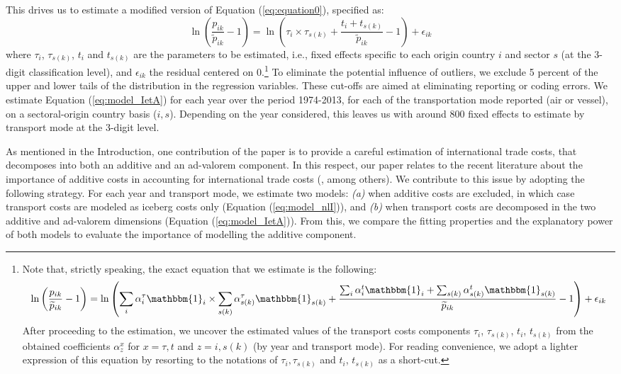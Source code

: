 \documentclass[a4paper,11pt]{article}
\begin{document}
This drives us to estimate a modified version of Equation (\ref{eq:equation0}), specified as:
\begin{equation}
\ln\left(\frac{p_{ik}}{\widetilde{p}_{ik}}-1 \right)= \ln \left(\tau_{i} \times \tau_{s(k)}+\frac{t_{i} + t_{s(k)}}{\widetilde{p}_{ik}}-1 \right) + \epsilon_{ik} \label{eq:model_IetA}
\end{equation}
where $\tau_{i}$, $\tau_{s(k)}$, $t_{i}$ and $t_{s(k)}$ are the parameters to be estimated, i.e., fixed effects specific to each origin country $i$ and sector $s$ (at the 3-digit classification level), and $\epsilon_{ik}$ the residual centered on 0.\footnote{Note that, strictly speaking, the exact equation that we estimate is the following:
$$\ln\left(\frac{p_{ik}}{\widetilde{p}_{ik}}-1 \right)= \ln \left(\sum_i \alpha_i^\tau \mathbbm{1}_i \times \sum_{s(k)}\alpha_{s(k)}^\tau \mathbbm{1}_{s(k)}+ \frac{\sum_i\alpha_i^t\mathbbm{1}_i + \sum_{s(k)}\alpha^t_{s(k)}\mathbbm{1}_{s(k)}}{\widetilde{p}_{ik}}-1\right)+\epsilon_{ik} $$
After proceeding to the estimation, we uncover the estimated values of the transport costs components $\tau_{i}$, $\tau_{s(k)}$, $t_{i}$, $t_{s(k)}$ from the obtained coefficients $\alpha^{x}_{z}$ for $x=\tau,t$ and $z=i,s(k)$ (by year and transport mode). For reading convenience, we adopt a lighter expression of this equation by resorting to the notations of $\tau_i,\tau_{s(k)}$ and $t_i$, $t_{s(k)}$ as a short-cut.}  To eliminate the potential influence of outliers, we exclude 5 percent of the upper and lower tails of the distribution in the regression variables. These cut-offs are aimed at eliminating reporting or coding errors. We estimate Equation (\ref{eq:model_IetA}) for each year over the period 1974-2013, for each of the transportation mode reported (air or vessel), on a sectoral-origin country basis ($i,s$). Depending on the year considered, this leaves us with around 800 fixed effects to estimate by transport mode at the 3-digit level.   \medskip


As mentioned in the Introduction, one contribution of the paper is to provide a careful estimation of international trade costs, that decomposes into both an additive and an ad-valorem component. In this respect, our paper relates to the recent literature about the importance of additive costs in accounting for international trade costs (\cite{Irrazabal_2015}, among others). We contribute to this issue by adopting the following strategy. For each year and transport mode, we estimate two models: \textit{(a)} when additive costs are excluded, in which case transport costs are modeled as iceberg costs only (Equation (\ref{eq:model_nlI})), and \textit{(b)} when transport costs are decomposed in the two additive and ad-valorem dimensions (Equation (\ref{eq:model_IetA})). From this, we compare the fitting properties and the explanatory power of both models to evaluate the importance of modelling the additive component.
\end{document}
